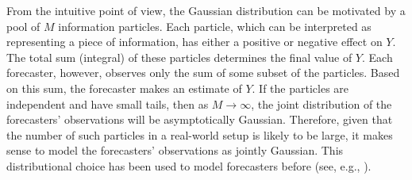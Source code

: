 \documentclass[11pt]{article}
\theoremstyle{definition}
\theoremstyle{definition}
\begin{document}
From the intuitive point of view, the Gaussian distribution can be motivated by a pool of $M$ information particles. Each particle, which can be interpreted as representing a piece of information, has either a positive or negative effect on $Y$. The total sum (integral) of these particles determines the final value of $Y$. Each forecaster, however, observes only the sum of some subset of the particles. Based on this sum, the forecaster makes an estimate of $Y$. 
If
the particles are independent
and have small tails, then as $M \to \infty$, the joint distribution
of the forecasters' observations will be asymptotically
Gaussian.  Therefore, given that the number of such particles in a real-world setup is likely to be large, it makes sense
to model the forecasters' observations as jointly Gaussian. This distributional choice has been used to model forecasters before (see, e.g., \citealt{broomell2009experts, Bacco}). 

\end{document}
